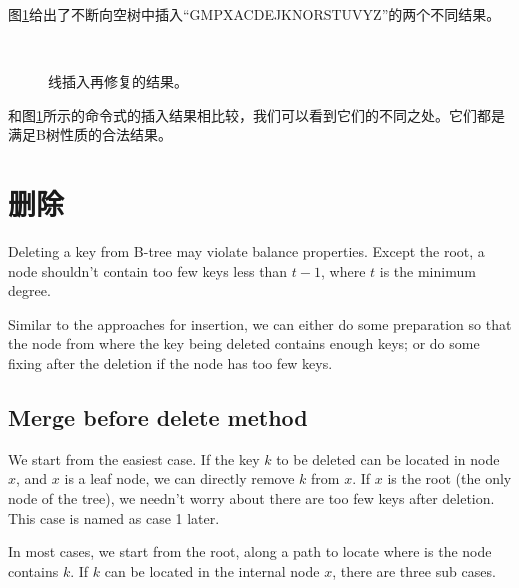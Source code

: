 \documentclass[UTF8]{article}
\begin{document}
图\ref{fig:btree-insert-fp}给出了不断向空树中插入“GMPXACDEJKNORSTUVYZ”的两个不同结果。

\begin{figure}[htbp]
  \centering
   \\
    \caption{线插入再修复的结果。} \label{fig:btree-insert-fp}
\end{figure}

和图\ref{fig:btree-insert-fp}所示的命令式的插入结果相比较，我们可以看到它们的不同之处。它们都是满足B树性质的合法结果。


\section{删除}

Deleting a key from
B-tree may violate balance properties. Except the root, a node shouldn't
contain too few keys less than $t-1$, where $t$ is the
minimum degree.

Similar to the approaches for insertion, we can either do some preparation
so that the node from where the key being deleted contains enough
keys; or do some fixing after the deletion if the node has too few keys.


\subsection{Merge before delete method}

We start from the easiest case. If the key $k$ to be deleted
can be located in node $x$, and $x$ is a leaf node,
we can directly remove $k$ from $x$. If $x$ is the root (the only
node of the tree), we needn't worry about there are too few
keys after deletion. This case is named as case 1 later.

In most cases, we start from the root, along a path to locate
where is the node contains $k$. If $k$ can be located in the
internal node $x$, there are three sub cases.
\end{document}
